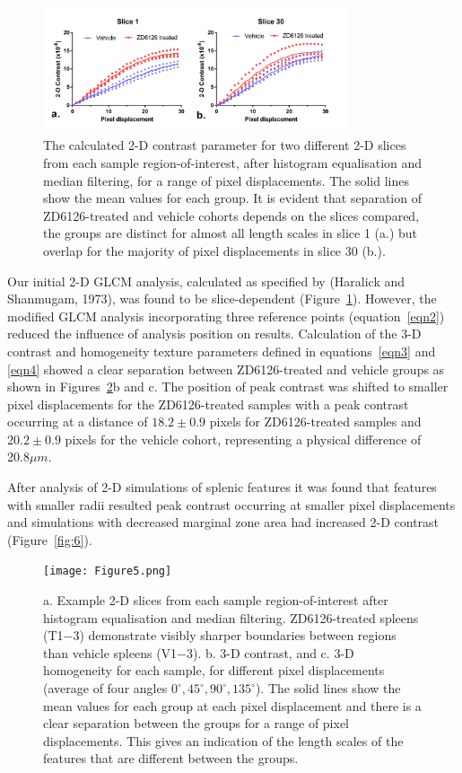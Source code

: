 \documentclass[12pt]{article}
\begin{document}
\begin{figure}%
	\centering
	\includegraphics[width=0.8\textwidth]{Figure4.jpg}
	\caption{The calculated 2-D contrast parameter for two different 2-D slices from each sample region-of-interest, after histogram equalisation and median filtering, for a range of pixel displacements. The solid lines show the mean values for each group. It is evident that separation of ZD6126-treated and vehicle cohorts depends on the slices compared, the groups are distinct for almost all length scales in slice 1 (a.) but overlap for the majority of pixel displacements in slice 30 (b.). }
	\label{fig:4}
\end{figure}


Our initial 2-D GLCM analysis, calculated as specified by (Haralick and Shanmugam, 1973), 
was found to be slice-dependent (Figure~\ref{fig:4}). However, the modified GLCM analysis incorporating three reference points (equation~\ref{eqn2}) reduced the influence of analysis position on results. Calculation of the 3-D contrast and homogeneity texture parameters defined in equations~\ref{eqn3} and \ref{eqn4} showed a clear separation between ZD6126-treated and vehicle groups as shown in Figures~\ref{fig:5}b and c. The position of peak contrast was shifted to smaller pixel displacements for the ZD6126-treated samples with a peak contrast occurring at a distance of $18.2 \pm 0.9$ pixels for ZD6126-treated samples and $20.2 \pm 0.9$ pixels for the vehicle cohort, representing a physical difference of $20.8\mu m$.

After analysis of 2-D simulations of splenic features it was found that features with smaller radii resulted peak contrast occurring at smaller pixel displacements and simulations with decreased marginal zone area had increased 2-D contrast (Figure~\ref{fig:6}). 

\begin{figure}%
	\centering
	\texttt{[image: Figure5.png]}
	\caption{a. Example 2-D slices from each sample region-of-interest after histogram equalisation and median filtering. ZD6126-treated spleens (T1−3) demonstrate visibly sharper boundaries between regions than vehicle spleens (V1−3). b. 3-D contrast, and c. 3-D homogeneity for each sample, for different pixel displacements (average of four angles $0^{\circ}, 45^{\circ}, 90^{\circ}, 135^{\circ}$). The solid lines show the mean values for each group at each pixel displacement and there is a clear separation between the groups for a range of pixel displacements. This gives an indication of the length scales of the features that are different between the groups.}
	\label{fig:5}
\end{figure}
\end{document}
